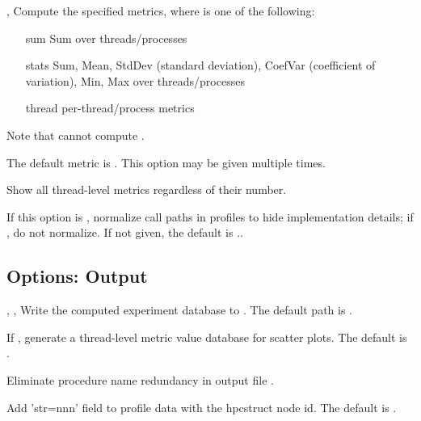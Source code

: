 \documentclass[english]{article}
\begin{document}
\begin{Description}

\item[\OptArg{-M}{metric}, \OptArg{--metric}{metric}]
Compute the specified metrics, where  is one of the following:
  \begin{itemize}
  \item[sum] Sum over threads/processes
  \item[stats] Sum, Mean, StdDev (standard deviation), CoefVar (coefficient of variation),
  Min, Max over threads/processes
  \item[thread] per-thread/process metrics
  \end{itemize}
Note that  cannot compute .

The default metric is .
This option may be given multiple times.

\item[\Opt{--force-metric}]
Show all thread-level metrics regardless of their number.

\item[\OptArg{--normalize}{all | none}]
If this option is , normalize call paths in profiles to hide implementation details;
if , do not normalize.
If not given, the default is ..

\end{Description}

\subsection{Options: Output}

\begin{Description}

\item[\OptArg{-o}{db-path}, \OptArg{--db}{db-path}, \OptArg{--output}{db-path}]
Write the computed experiment database to .
The default path is .

\item[\OptArg{--metric-db}{yes | no}]
If , generate a thread-level metric value database for  scatter plots.
The default is .

\item[\Opt{--remove-redundancy}]
Eliminate procedure name redundancy in output file .

\item[\Opt{--struct-id}]
Add 'str=nnn' field to profile data with the hpcstruct node id.
The default is .

\end{Description}
\end{document}
